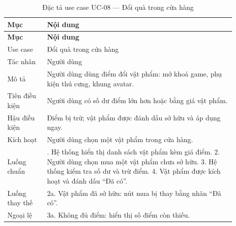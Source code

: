 \begingroup\small\renewcommand{\arraystretch}{1.15}\setlength{\tabcolsep}{3pt}
\begin{longtable}{>{\RaggedRight\arraybackslash}p{0.16\linewidth}>{\RaggedRight\arraybackslash}p{0.76\linewidth}}
\caption{Đặc tả use case UC-08 --- Đổi quà trong cửa hàng}
\label{tab:spec-uc-08}\\
\toprule
\textbf{Mục} & \textbf{Nội dung} \\
\midrule
\endfirsthead
\toprule
\textbf{Mục} & \textbf{Nội dung} \\
\midrule
\endhead
\bottomrule
\endfoot
Use case & Đổi quà trong cửa hàng \\
Tác nhân & Người dùng \\
Mô tả & Người dùng dùng điểm đổi vật phẩm: mở khoá game, phụ kiện thú cưng, khung avatar. \\
Tiên điều kiện & Người dùng có số dư điểm lớn hơn hoặc bằng giá vật phẩm. \\
Hậu điều kiện & Điểm bị trừ; vật phẩm được đánh dấu sở hữu và áp dụng ngay. \\
Kích hoạt & Người dùng chọn một vật phẩm trong cửa hàng. \\
Luồng chuẩn & 1. Hệ thống hiển thị danh sách vật phẩm kèm giá điểm. 2. Người dùng chọn mua một vật phẩm chưa sở hữu. 3. Hệ thống kiểm tra số dư và trừ điểm. 4. Vật phẩm được kích hoạt và đánh dấu “Đã có”. \\
Luồng thay thế & 2a. Vật phẩm đã sở hữu: nút mua bị thay bằng nhãn “Đã có”. \\
Ngoại lệ & 3a. Không đủ điểm: hiển thị số điểm còn thiếu. \\
\end{longtable}
\endgroup

